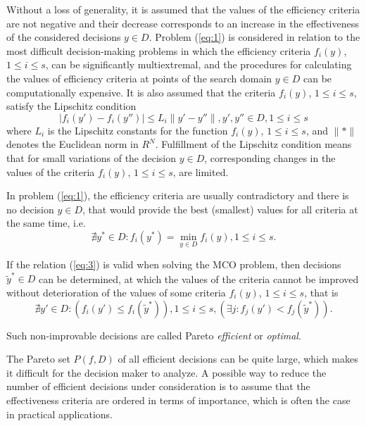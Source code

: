 \documentclass[smallextended]{svjour3}       %
\begin{document}
Without a loss of generality, it is assumed that the values of the efficiency criteria are not negative and their decrease corresponds to an increase in the effectiveness of the considered decisions $y \in D$. Problem (\ref{eq:1}) is considered in relation to the most difficult decision-making problems in which the efficiency criteria $f_i(y)$, $1 \leq i \leq s$, can be significantly multiextremal, and the procedures for calculating the values of efficiency criteria at points of the search domain $y \in D$ can be computationally expensive. It is also assumed that the criteria $f_i(y)$, $1 \leq i \leq s$, satisfy the Lipschitz condition
\begin{equation}\label{eq:2l}
|f_i (y')-f_i (y'')| \leq L_i \|y'-y''\|, y',y''\in D, 1 \leq i \leq s
\end{equation}
where $L_i$ is the Lipschitz constants for the function $f_i(y)$, $1 \leq i \leq s$, and $\|*\|$ denotes the Euclidean norm in $R^N$. Fulfillment of the Lipschitz condition means that for small variations of the decision $y \in D$, corresponding changes in the values of the criteria $f_i(y)$, $1 \leq i \leq s$, are limited.

In problem (\ref{eq:1}), the efficiency criteria are usually contradictory and there is no decision $y \in D$, that would provide the best (smallest) values for all criteria at the same time, i.e.
\begin{equation}\label{eq:3}
\nexists y^*\in D: f_i(y^*) = \min_{y \in D} {f_i (y)} , 1 \leq i \leq s.
\end{equation}

If the relation (\ref{eq:3}) is valid when solving the MCO problem, then decisions $\widetilde{y}^* \in D$ can be determined, at which the values of the criteria cannot be improved without deterioration of the values of some criteria $f_i(y)$, $1 \leq i \leq s$, that is
\begin{equation}\label{eq:4}
\nexists y'\in D: (f_i(y') \leq f_i(\widetilde{y}^*)), 1 \leq i \leq s, (\exists j : f_j(y') < f_j(\widetilde{y}^*)).
\end{equation}

Such non-improvable decisions are called Pareto \textit{efficient} or \textit{optimal}.

The Pareto set $P(f,D)$ of all efficient decisions can be quite large, which makes it difficult for the decision maker to analyze. A possible way to reduce the number of efficient decisions under consideration is to assume that the effectiveness criteria are ordered in terms of importance, which is often the case in practical applications.
\end{document}
